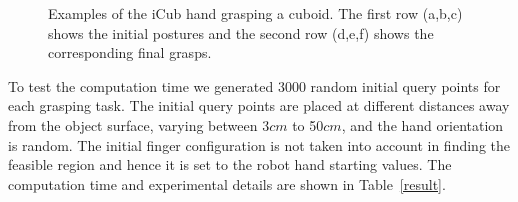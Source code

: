 \begin{figure}

  \caption{\scriptsize{Examples of the iCub hand grasping a cuboid. The first row (a,b,c) shows the initial postures and the second row (d,e,f) shows the corresponding final grasps.}
}
    \label{icub_cuboid}
\end{figure}

To test the computation time we generated 3000 random initial query points for each grasping task. The initial query points are placed at different distances away from the object surface, varying between 3$cm$ to 50$cm$, and the hand orientation is random. The initial finger configuration is not taken into account in finding the feasible region and hence it is set to the robot hand starting values. The computation time and experimental details are shown in Table~\ref{result}.


